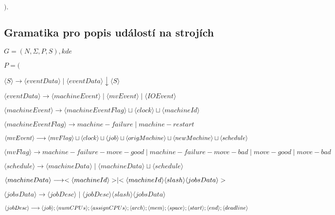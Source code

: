 \documentclass[draft]{fithesis}
\begin{document}
\begin{list}{}{$).$}
	\item
\end{list}

\subsection*{Gramatika pro popis událostí na strojích}
$G = (N, \Sigma, P, S), kde$

\begin{list}{}{$P = ($}
	\item $\langle S \rangle 
		\longrightarrow 
		\langle eventData \rangle \mid \langle eventData \rangle \downarrow \langle S \rangle$
	\item $\langle eventData \rangle 
		\longrightarrow 
		\langle machineEvent \rangle \mid \langle mvEvent \rangle \mid \langle IOEvent \rangle$
	\item $\langle machineEvent \rangle 
		\longrightarrow 
		\langle machineEventFlag \rangle \sqcup \langle clock \rangle \sqcup \langle machineId \rangle$
	\item $\langle machineEventFlag \rangle 
		\longrightarrow 
		machine-failure \mid machine-restart$
	\item $\langle mvEvent \rangle 
		\longrightarrow 
		\langle mvFlag \rangle \sqcup \langle clock \rangle \sqcup \langle job \rangle \sqcup \langle origMachine \rangle \sqcup \\ \langle newMachine \rangle \sqcup \langle schedule \rangle$
	\item $\langle mvFlag \rangle 
		\longrightarrow 
		machine-failure-move-good \mid machine-failure-move-bad \mid move-good \mid move-bad$
	\item $\langle schedule \rangle 
		\longrightarrow 
		\langle machineData \rangle \mid \langle machineData \rangle \sqcup \langle schedule \rangle$
	\item $\langle machineData \rangle 
		\longrightarrow 
		< \langle machineId \rangle > \mid < \langle machineId \rangle \langle slash \rangle \\ \langle jobsData \rangle >$
	\item $\langle jobsData \rangle 
		\longrightarrow 
		\langle jobDesc \rangle \mid \langle jobDesc \rangle \langle slash \rangle \langle jobsData \rangle$
	\item $\langle jobDesc \rangle 
		\longrightarrow 
		\langle job \rangle ; \langle numCPUs \rangle ; \langle assignCPUs \rangle ; \langle arch \rangle ; \langle mem \rangle ;\\ \langle space \rangle ; \langle start \rangle ; \langle end \rangle ; \langle deadline \rangle$

\end{list}
\end{document}
